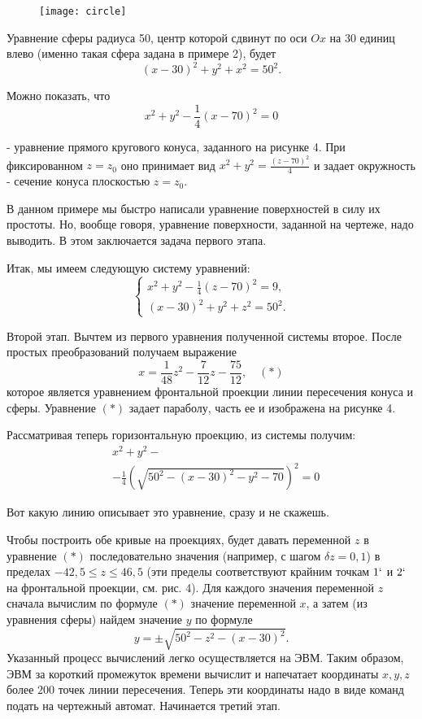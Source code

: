 \twocolumn
\setcounter{figure}{4}
\begin{figure}[h]
	\centering
	\texttt{[image: circle]}
	\caption{}
	\label{fig:circle}
\end{figure}
\vspace{-\baselineskip}

Уравнение сферы радиуса 50, центр которой сдвинут по оси $Ox$ на 30 единиц влево (именно такая сфера задана в примере 2), будет
$$(x - 30)^2 + y^2 + x^2 = 50^2.$$

Можно показать, что
$$x^2 + y^2 - \frac{1}{4}(x - 70)^2 = 0$$

\noindent - уравнение прямого кругового конуса, заданного на рисунке 4. При фиксированном $z = z_0$ оно принимает вид $x^2 + y^2 = \frac{(z - 70)^2}{4}$ и задает окружность - сечение конуса плоскостью $z = z_0$.

В данном примере мы быстро написали уравнение поверхностей в силу их простоты. Но, вообще говоря, уравнение поверхности, заданной на чертеже, надо выводить. В этом заключается задача первого этапа.

Итак, мы имеем следующую систему уравнений:
$$
\begin{cases}
	x^2 + y^2 - \frac{1}{4}(z - 70)^2 = 9, \\
	(x - 30)^2 + y^2 + z^2 = 50^2.
\end{cases}
$$

{ Второй этап}. Вычтем из первого уравнения полученной системы второе. После простых преобразований получаем выражение
$$x = \frac{1}{48}z^2 - \frac{7}{12}z - \frac{75}{12}, \quad (*)$$
которое является уравнением фронтальной проекции линии пересечения конуса и сферы. Уравнение $(*)$ задает параболу, часть ее и изображена на рисунке 4.

Рассматривая теперь горизонтальную проекцию, из системы получим:
\begin{equation*}
	\begin{split}
		&x^2 + y^2 - \\
		&- \frac{1}{4}(\sqrt{50^2 - (x - 30)^2-y^2-70})^2 = 0
	\end{split}
\end{equation*}

Вот какую линию описывает это уравнение, сразу и не скажешь.

Чтобы построить обе кривые на проекциях, будет давать переменной $z$ в уравнение $(*)$ последовательно значения (например, с шагом $\delta z = 0,1$) в пределах $-42,5 \leq z \leq 46,5$ (эти пределы соответствуют крайним точкам $1`$ и $2`$ на фронтальной проекции, см. рис. 4). Для каждого значения переменной $z$ сначала вычислим по формуле $(*)$ значение переменной $x$, а затем (из уравнения сферы) найдем значение $y$ по формуле 
$$y = \pm \sqrt{50^2 - z^2 - (x - 30)^2}.$$
Указанный процесс вычислений легко осуществляется на ЭВМ. Таким образом, ЭВМ за короткий промежуток времени вычислит и напечатает координаты $x, y, z$ более $200$ точек линии пересечения. Теперь эти координаты надо в виде команд подать на чертежный автомат. Начинается третий этап. \\

